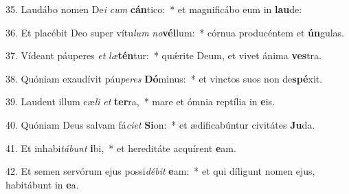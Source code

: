 35. Laudábo nomen De\textit{i} \textit{cum} \textbf{cán}tico:~*  et magnificábo eum in \textbf{lau}de:\

36. Et placébit Deo super vítu\textit{lum} \textit{no}\textbf{vél}lum:~*  córnua producéntem et \textbf{ún}gulas.\

37. Vídeant páuperes \textit{et} \textit{læ}\textbf{tén}tur:~*  quǽrite Deum, et vivet ánima \textbf{ves}tra.\

38. Quóniam exaudívit páu\textit{pe}\textit{res} \textbf{Dó}minus:~*  et vinctos suos non de\textbf{spé}xit.\

39. Laudent illum cæ\textit{li} \textit{et} \textbf{ter}ra,~*  mare et ómnia reptília in \textbf{e}is.\

40. Quóniam Deus salvam fá\textit{ci}\textit{et} \textbf{Si}on:~*  et ædificabúntur civitátes \textbf{Ju}da.\

41. Et inhabi\textit{tá}\textit{bunt} \textbf{i}bi,~*  et hereditáte acquírent \textbf{e}am.\

42. Et semen servórum ejus possi\textit{dé}\textit{bit} \textbf{e}am:~*  et qui díligunt nomen ejus, habitábunt in \textbf{e}a.\


